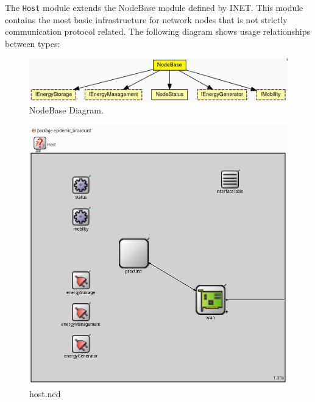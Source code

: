 The \texttt{Host} module extends the NodeBase module defined by INET. This
module contains the most basic infrastructure for network nodes that is not
strictly communication protocol related. The following diagram shows usage
relationships between types:
\begin{figure}[H]
    \begin{center}
        \includegraphics[scale=0.26]{img/nodebase.png}
        \caption{NodeBase Diagram.}
        \label{fig:nodebaseOmnet}
    \end{center}
    \vspace*{-0.8cm}
\end{figure}
\begin{figure}[H]
    \begin{center}
        \includegraphics[scale=0.35]{img/host.png}
        \caption{host.ned}
        \label{fig:hostOmnet}
    \end{center}
    \vspace*{-0.8cm}
\end{figure}
